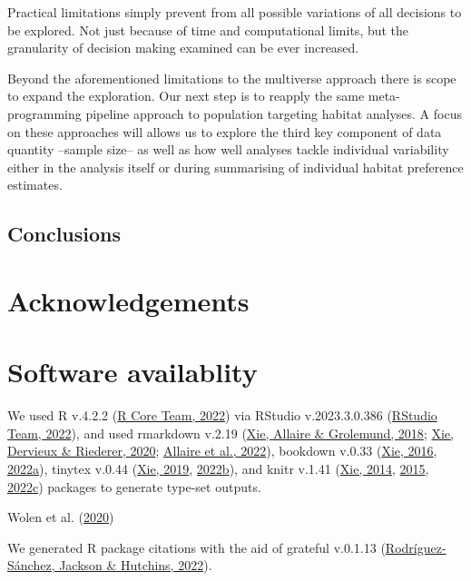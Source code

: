 \documentclass[10pt,a4paper]{article}
\begin{document}
Practical limitations simply prevent from all possible variations of all decisions to be explored.
Not just because of time and computational limits, but the granularity of decision making examined can be ever increased.

Beyond the aforementioned limitations to the multiverse approach there is scope to expand the exploration.
Our next step is to reapply the same meta-programming pipeline approach to population targeting habitat analyses.
A focus on these approaches will allows us to explore the third key component of data quantity --sample size-- as well as how well analyses tackle individual variability either in the analysis itself or during summarising of individual habitat preference estimates.

\hypertarget{conclusions}{%
\subsection{Conclusions}\label{conclusions}}

\hypertarget{acknowledgements}{%
\section{Acknowledgements}\label{acknowledgements}}

\hypertarget{software-availablity}{%
\section{Software availablity}\label{software-availablity}}

We used R v.4.2.2 (\protect\hyperlink{ref-base}{R Core Team, 2022}) via RStudio v.2023.3.0.386 (\protect\hyperlink{ref-rstudio}{RStudio Team, 2022}), and used rmarkdown v.2.19 (\protect\hyperlink{ref-rmarkdown2018}{Xie, Allaire \& Grolemund, 2018}; \protect\hyperlink{ref-rmarkdown2020}{Xie, Dervieux \& Riederer, 2020}; \protect\hyperlink{ref-rmarkdown2022}{Allaire et al., 2022}), bookdown v.0.33 (\protect\hyperlink{ref-bookdown2016}{Xie, 2016}, \protect\hyperlink{ref-R-bookdown}{2022a}), tinytex v.0.44 (\protect\hyperlink{ref-tinytex2019}{Xie, 2019}, \protect\hyperlink{ref-tinytex2022}{2022b}), and knitr v.1.41 (\protect\hyperlink{ref-knitr2014}{Xie, 2014}, \protect\hyperlink{ref-knitr2015}{2015}, \protect\hyperlink{ref-knitr2022}{2022c}) packages to generate type-set outputs.

Wolen et al. (\protect\hyperlink{ref-osfr}{2020})

We generated R package citations with the aid of grateful v.0.1.13 (\protect\hyperlink{ref-grateful}{Rodríguez-Sánchez, Jackson \& Hutchins, 2022}).
\end{document}

